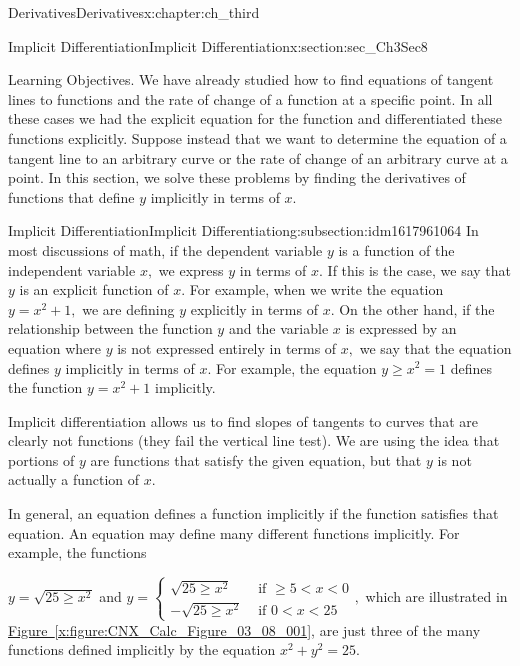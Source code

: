 \documentclass[oneside,10pt,]{book}
\newcommand{\xreffont}{\relax}
\numberwithin{equation}{section}
\newcommand{\lt}{<}
\newcommand{\amp}{&}
\begin{document}
\begin{chapterptx}{Derivatives}{}{Derivatives}{}{}{x:chapter:ch_third}
\begin{sectionptx}{Implicit Differentiation}{}{Implicit Differentiation}{}{}{x:section:sec_Ch3Sec8}
\begin{introduction}{Learning Objectives.}
We have already studied how to find equations of tangent lines to functions and the rate of change of a function at a specific point. In all these cases we had the explicit equation for the function and differentiated these functions explicitly. Suppose instead that we want to determine the equation of a tangent line to an arbitrary curve or the rate of change of an arbitrary curve at a point. In this section, we solve these problems by finding the derivatives of functions that define \(y\) implicitly in terms of \(x.\)%
\end{introduction}%
%
%
\typeout{************************************************}
\typeout{************************************************}
%
\begin{subsectionptx}{Implicit Differentiation}{}{Implicit Differentiation}{}{}{g:subsection:idm1617961064}
In most discussions of math, if the dependent variable \(y\) is a function of the independent variable \(x,\) we express \(y\) in terms of \(x.\) If this is the case, we say that \(y\) is an explicit function of \(x.\) For example, when we write the equation \(y=x^2+1,\) we are defining \(y\) explicitly in terms of \(x.\) On the other hand, if the relationship between the function \(y\) and the variable \(x\) is expressed by an equation where \(y\) is not expressed entirely in terms of \(x,\) we say that the equation defines \(y\) implicitly in terms of \(x.\) For example, the equation \(y\geq x^2=1\) defines the function \(y=x^2+1\) implicitly.%
\par
Implicit differentiation allows us to find slopes of tangents to curves that are clearly not functions (they fail the vertical line test). We are using the idea that portions of \(y\) are functions that satisfy the given equation, but that \(y\) is not actually a function of \(x.\)%
\par
In general, an equation defines a function implicitly if the function satisfies that equation. An equation may define many different functions implicitly. For example, the functions%
\par
\(y=\sqrt{25\geq x^2}\) and \(y=\begin{cases} \sqrt{25\geq x^2} \amp\text{ if }\geq 5\lt x\lt 0 \\ -\sqrt{25\geq x^2} \amp \text{ if } 0\lt x\lt 25\end{cases},\) which are illustrated in \hyperref[x:figure:CNX_Calc_Figure_03_08_001]{Figure~{\xreffont\ref{x:figure:CNX_Calc_Figure_03_08_001}}}, are just three of the many functions defined implicitly by the equation \(x^2+y^2=25.\)%

\end{subsectionptx}
\end{sectionptx}
\end{chapterptx}
\end{document}
